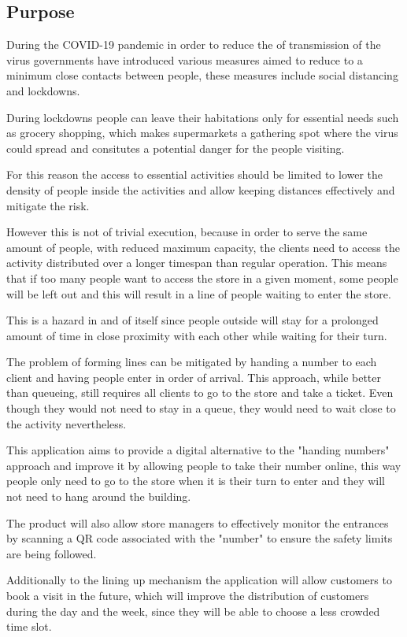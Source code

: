 \subsection{Purpose}

During the COVID-19 pandemic in order to reduce the of transmission of the virus governments have introduced various measures aimed to reduce to a minimum close contacts between people, these measures include social distancing and lockdowns.

During lockdowns people can leave their habitations only for essential needs such as grocery shopping, which makes supermarkets a gathering spot where the virus could spread and consitutes a potential danger for the people visiting.

For this reason the access to essential activities should be limited to lower the density of people inside the activities and allow keeping distances effectively and mitigate the risk.

However this is not of trivial execution, because in order to serve the same amount of people, with reduced maximum capacity, the clients need to access the activity distributed over a longer timespan than regular operation. This means that if too many people want to access the store in a given moment, some people will be left out and this will result in a line of people waiting to enter the store.

This is a hazard in and of itself since people outside will stay for a prolonged amount of time in close proximity with each other while waiting for their turn.

The problem of forming lines can be mitigated by handing a number to each client and having people enter in order of arrival. This approach, while better than queueing, still requires all clients to go to the store and take a ticket. Even though they would not need to stay in a queue, they would need to wait close to the activity nevertheless.

This application aims to provide a digital alternative to the "handing numbers" approach and improve it by allowing people to take their number online, this way people only need to go to the store when it is their turn to enter and they will not need to hang around the building.

The product will also allow store managers to effectively monitor the entrances by scanning a QR code associated with the "number" to ensure the safety limits are being followed.

Additionally to the lining up mechanism the application will allow customers to book a visit in the future, which will improve the distribution of customers during the day and the week, since they will be able to choose a less crowded time slot.

